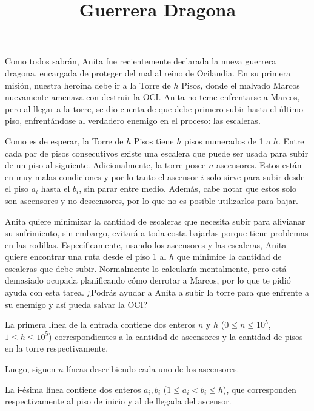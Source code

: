 \documentclass{oci}
\title{Guerrera Dragona}
\begin{document}
\begin{problemDescription}
  Como todos sabrán, Anita fue recientemente
  declarada la nueva guerrera dragona, encargada
  de proteger del mal al reino de Ocilandia.
  En su primera misión, nuestra heroína debe ir
  a la Torre de $h$ Pisos, donde el malvado
  Marcos nuevamente amenaza con destruir la OCI.
  Anita no teme enfrentarse a Marcos, pero al llegar a
  la torre, se dio cuenta de que debe primero subir
  hasta el último piso, enfrentándose al verdadero enemigo
  en el proceso: las escaleras.


  Como es de esperar, la Torre de $h$ Pisos tiene $h$ pisos
  numerados de 1 a $h$.
  Entre cada par de pisos consecutivos existe una
  escalera que puede ser usada para subir de un piso al
  siguiente.
  Adicionalmente, la torre posee $n$ ascensores.
  Estos están en muy malas condiciones y por lo tanto el
  ascensor $i$ solo sirve para subir desde el piso $a_i$ hasta el
  $b_i$, sin parar entre medio.
  Además, cabe notar que estos solo son ascensores y no descensores,
  por lo que no es posible utilizarlos para bajar.

  Anita quiere minimizar la cantidad de escaleras que
  necesita subir para alivianar su sufrimiento, sin embargo,
  evitará a toda costa bajarlas porque tiene
  problemas en las rodillas.
  Específicamente, usando los ascensores y las escaleras,
  Anita quiere encontrar una ruta desde el piso 1 al $h$ que
  minimice la cantidad de escaleras que debe subir.
  Normalmente lo calcularía mentalmente, pero está demasiado
  ocupada planificando cómo derrotar a Marcos, por lo que
  te pidió ayuda con esta tarea.
  ¿Podrás ayudar a Anita a subir la torre para
  que enfrente a su enemigo y así pueda salvar la OCI?
\end{problemDescription}

\begin{inputDescription}
  La primera línea de la entrada contiene dos enteros
  $n$ y $h$ ($0 \leq n \leq 10^5$, $1 \leq h \leq 10^5$)
  correspondientes a la cantidad de ascensores y la cantidad
  de pisos en la torre respectivamente.

  Luego, siguen $n$ líneas describiendo cada uno de los ascensores.

  La i-ésima línea contiene dos enteros $a_i, b_i$
  ($1 \leq a_i < b_i \leq h$), que corresponden respectivamente
  al piso de inicio y al de llegada del ascensor.
\end{inputDescription}
\end{document}
